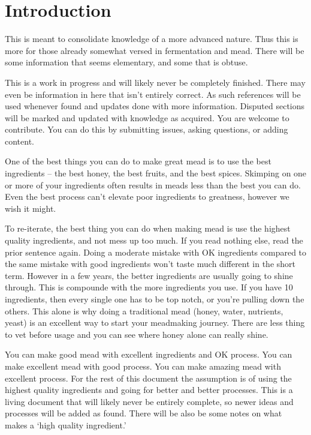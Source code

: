 \section{Introduction}
 This is meant to consolidate knowledge of a more advanced nature. Thus this is more for those already somewhat 
 versed in fermentation and mead. There will be some information that seems elementary, and some that is obtuse.

 This is a work in progress and will likely never be completely finished. There may even be information in
 here that isn't entirely correct. As such references will be used whenever found and updates done with more 
 information. Disputed sections will be marked and updated with knowledge as acquired. You are welcome to 
 contribute. You can do this by submitting issues, asking questions, or adding content.

 One of the best things you can do to make great mead is to use the best ingredients -- the best honey, the best 
 fruits, and the best spices. Skimping on one or more of your ingredients often results in meads less than the 
 best you can do. Even the best process can't elevate poor ingredients to greatness, however we wish it might.

 To re-iterate, the best thing you can do when making mead is use the highest quality ingredients, and not mess
 up too much. If you read nothing else, read the prior sentence again. Doing a moderate mistake with OK ingredients
 compared to the same mistake with good ingredients won't taste much different in the short term. However in a few
 years, the better ingredients are usually going to shine through. This is compounde with the more ingredients you
 use. If you have 10 ingredients, then every single one has to be top notch, or you're pulling down the others.
 This alone is why doing a traditional mead (honey, water, nutrients, yeast) is an excellent way to start your
 meadmaking journey. There are less thing to vet before usage and you can see where honey alone can really shine.

 You can make good mead with excellent ingredients and OK process. You can make excellent mead with good process. You
 can make amazing mead with excellent process. For the rest of this document the assumption is of using the highest
 quality ingredients and going for better and better processes. This is a living document that will likely never 
 be entirely complete, so newer ideas and processes will be added as found.
 There will be also be some notes on what makes a `high quality ingredient.'

